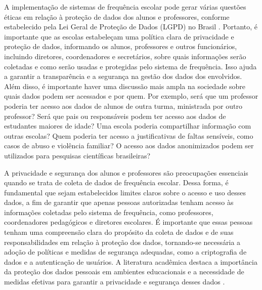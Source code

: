 A implementação de sistemas de frequência escolar pode gerar várias questões éticas em relação à proteção de dados dos alunos e professores, conforme estabelecido pela Lei Geral de Proteção de Dados (LGPD) no Brasil \cite{LGPD}. Portanto, é importante que as escolas estabeleçam uma política clara de privacidade e proteção de dados, informando os alunos, professores e outros funcionários, incluindo diretores, coordenadores e secretários, sobre quais informações serão coletadas e como serão usadas e protegidas pelo sistema de frequência. Isso ajuda a garantir a transparência e a segurança na gestão dos dados dos envolvidos. Além disso, é importante haver uma discussão mais ampla na sociedade sobre quais dados podem ser acessados e por quem. Por exemplo, será que um professor poderia ter acesso aos dados de alunos de outra turma, ministrada por outro professor? Será que pais ou responsáveis podem ter acesso aos dados de estudantes maiores de idade? Uma escola poderia compartilhar informação com outras escolas? Quem poderia ter acesso a justificativas de faltas sensíveis, como casos de abuso e violência familiar? O acesso aos dados anonimizados podem ser utilizados para pesquisas científicas brasileiras? 

A privacidade e segurança dos alunos e professores são preocupações essenciais quando se trata de coleta de dados de frequência escolar. Dessa forma, é fundamental que sejam estabelecidos limites claros sobre o acesso e uso desses dados, a fim de garantir que apenas pessoas autorizadas tenham acesso às informações coletadas pelo sistema de frequência, como professores, coordenadores pedagógicos e diretores escolares. É importante que essas pessoas tenham uma compreensão clara do propósito da coleta de dados e de suas responsabilidades em relação à proteção dos dados, tornando-se necessária a adoção de políticas e medidas de segurança adequadas, como a criptografia de dados e a autenticação de usuários. A literatura acadêmica destaca a importância da proteção dos dados pessoais em ambientes educacionais e a necessidade de medidas efetivas para garantir a privacidade e segurança desses dados \cite{Amo2021}.

